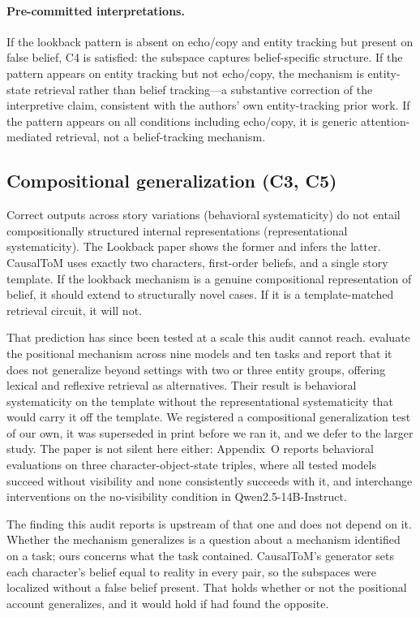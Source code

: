 \documentclass{article}
\begin{document}
\paragraph{Pre-committed interpretations.} If the lookback pattern is absent on echo/copy and entity tracking but present on false belief, C4 is satisfied: the subspace captures belief-specific structure. If the pattern appears on entity tracking but not echo/copy, the mechanism is entity-state retrieval rather than belief tracking---a substantive correction of the interpretive claim, consistent with the authors' own entity-tracking prior work. If the pattern appears on all conditions including echo/copy, it is generic attention-mediated retrieval, not a belief-tracking mechanism.

\subsection{Compositional generalization (C3, C5)}
\label{sec:composition}

Correct outputs across story variations (behavioral systematicity) do not entail compositionally structured internal representations (representational systematicity). The Lookback paper shows the former and infers the latter. CausalToM uses exactly two characters, first-order beliefs, and a single story template. If the lookback mechanism is a genuine compositional representation of belief, it should extend to structurally novel cases. If it is a template-matched retrieval circuit, it will not.

That prediction has since been tested at a scale this audit cannot reach.
\citet{gurarieh2025mixing} evaluate the positional mechanism across nine models and ten
tasks and report that it does not generalize beyond settings with two or three entity
groups, offering lexical and reflexive retrieval as alternatives. Their result is behavioral
systematicity on the template without the representational systematicity that would carry
it off the template. We registered a compositional generalization test of our own, it was
superseded in print before we ran it, and we defer to the larger study. The paper is not silent
here either: Appendix~O reports behavioral evaluations on three character-object-state triples,
where all tested models succeed without visibility and none consistently succeeds with it, and
interchange interventions on the no-visibility condition in Qwen2.5-14B-Instruct.

The finding this audit reports is upstream of that one and does not depend on it. Whether
the mechanism generalizes is a question about a mechanism identified on a task; ours concerns
what the task contained. CausalToM's generator sets each character's belief equal to reality in
every pair, so the subspaces were localized without a false belief present. That holds whether
or not the positional account generalizes, and it would hold if \citet{gurarieh2025mixing} had
found the opposite.
\end{document}
